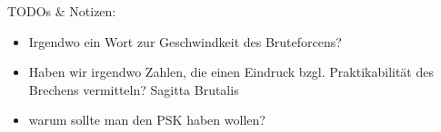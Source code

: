 TODOs \& Notizen:
\begin{itemize}
	\item Irgendwo ein Wort zur Geschwindkeit des Bruteforcens?
	\item Haben wir irgendwo Zahlen, die einen Eindruck bzgl. Praktikabilität des Brechens vermitteln? Sagitta Brutalis
	\item warum sollte man den PSK haben wollen?
\end{itemize}